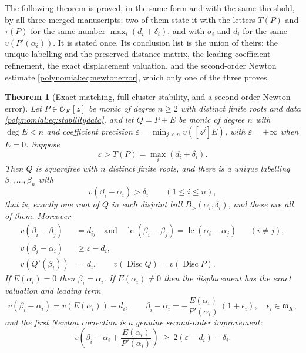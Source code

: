 \documentclass[11pt,letterpaper]{article}
\numberwithin{equation}{section}
\newtheorem{theorem}{Theorem}[section]
\theoremstyle{definition}
\theoremstyle{remark}\newtheorem{remark}[theorem]{Remark}
\newcommand{\OO}{\mathcal O}
\newcommand{\mm}{\mathfrak m}
\newcommand{\Disc}{\operatorname{Disc}}
\newcommand{\lc}{\operatorname{lc}}
\newcommand{\Bgt}[2]{B_{>}(#1,#2)}
\begin{document}
The following theorem is proved, in the same form and with the same threshold,
by all three merged manuscripts; two of them state it with the letters $T(P)$
and $\tau(P)$ for the same number $\max_i(d_i+\delta_i)$, and with $\sigma_i$
and $d_i$ for the same $v(P'(\alpha_i))$. It is stated once. Its conclusion
list is the union of theirs: the unique labelling and the preserved distance
matrix, the leading-coefficient refinement, the exact displacement valuation,
and the second-order Newton estimate
\eqref{polynomial:eq:newtonerror}, which only one of the three proves.

\begin{theorem}[Exact matching, full cluster stability, and a second-order
Newton error]\label{polynomial:thm:stability}
Let $P\in\OO_K[z]$ be monic of degree $n\ge2$ with distinct finite roots and
data \eqref{polynomial:eq:stabilitydata}, and let $Q=P+E$ be monic of degree
$n$ with $\deg E<n$ and coefficient precision
$\varepsilon=\min_{j<n}v([z^j]E)$, with $\varepsilon=+\infty$ when $E=0$.
Suppose
\begin{equation}\label{polynomial:eq:stabilitythreshold}
 \varepsilon>T(P)=\max_i(d_i+\delta_i).
\end{equation}
Then $Q$ is squarefree with $n$ distinct finite roots, and there is a
\emph{unique} labelling $\beta_1,\ldots,\beta_n$ with
\begin{equation}\label{polynomial:eq:matchingballs}
 v(\beta_i-\alpha_i)>\delta_i\qquad(1\le i\le n),
\end{equation}
that is, exactly one root of $Q$ in each disjoint ball
$\Bgt{\alpha_i}{\delta_i}$, and these are all of them. Moreover
\begin{align}
 v(\beta_i-\beta_j)&=d_{ij}\quad\text{and}\quad
 \lc(\beta_i-\beta_j)=\lc(\alpha_i-\alpha_j) &&(i\ne j),
 \label{polynomial:eq:pairwisepreserved}\\
 v(\beta_i-\alpha_i)&\ge\varepsilon-d_i,\label{polynomial:eq:shiftbound}\\
 v(Q'(\beta_i))&=d_i,\qquad v(\Disc Q)=v(\Disc P).
 \label{polynomial:eq:discpreserved}
\end{align}
If $E(\alpha_i)=0$ then $\beta_i=\alpha_i$. If $E(\alpha_i)\ne0$ then the
displacement has the exact valuation and leading term
\begin{equation}\label{polynomial:eq:leadingdisplacement}
 v(\beta_i-\alpha_i)=v(E(\alpha_i))-d_i,
 \qquad
 \beta_i-\alpha_i=-\frac{E(\alpha_i)}{P'(\alpha_i)}\,(1+\epsilon_i),
 \quad \epsilon_i\in\mm_K,
\end{equation}
and the first Newton correction is a genuine second-order improvement:
\begin{equation}\label{polynomial:eq:newtonerror}
 v\left(\beta_i-\alpha_i+\frac{E(\alpha_i)}{P'(\alpha_i)}\right)
 \ \ge\ 2(\varepsilon-d_i)-\delta_i .
\end{equation}
\end{theorem}
\end{document}
